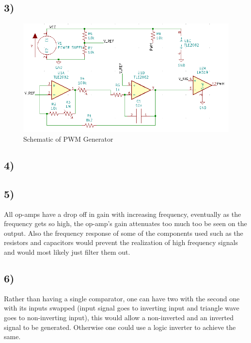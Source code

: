\documentclass[]{IEEEtran}
\begin{document}
\begin{multicols}{2}
\subsection{3)}

\end{multicols}
\begin{figure}[H]
	\centering
	\includegraphics[width=1\linewidth]{screenshot003}
	\caption{Schematic of PWM Generator}
	\label{fig:screenshot003}
\end{figure}
\begin{multicols}{2}
	\subsection{4)}
	\subsection{5)}
	All op-amps have a drop off in gain with increasing frequency, eventually as the frequency gets so high, the op-amp's gain attenuates too much too be seen on the output. Also the frequency response of some of the components used such as the resistors and capacitors would prevent the realization of high frequency signals and would most likely just filter them out.
	\subsection{6)}
	Rather than having a single comparator, one can have two with the second one with its inputs swapped (input signal goes to inverting input and triangle wave goes to non-inverting input), this would allow a non-inverted and an inverted signal to be generated. Otherwise one could use a logic inverter to achieve the same.
\end{multicols}
\end{document}
